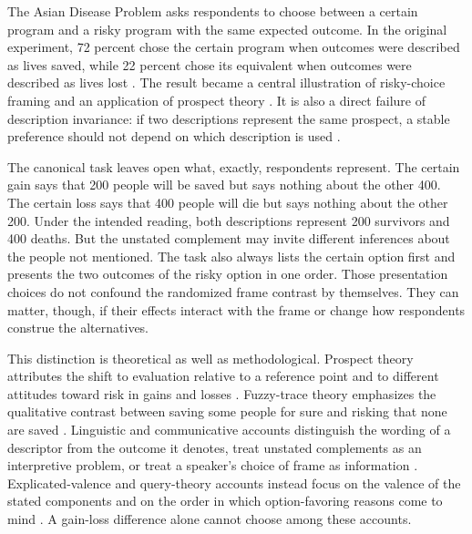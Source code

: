 \documentclass[11pt]{article}
\begin{document}
The Asian Disease Problem asks respondents to choose between a certain program and a risky program with the same expected outcome. In the original experiment, 72 percent chose the certain program when outcomes were described as lives saved, while 22 percent chose its equivalent when outcomes were described as lives lost \parencite{tversky1981framing}. The result became a central illustration of risky-choice framing and an application of prospect theory \parencite{kahneman1979prospect,levin1998typology}. It is also a direct failure of description invariance: if two descriptions represent the same prospect, a stable preference should not depend on which description is used \parencite{kahneman1984choices}.

The canonical task leaves open what, exactly, respondents represent. The certain gain says that 200 people will be saved but says nothing about the other 400. The certain loss says that 400 people will die but says nothing about the other 200. Under the intended reading, both descriptions represent 200 survivors and 400 deaths. But the unstated complement may invite different inferences about the people not mentioned. The task also always lists the certain option first and presents the two outcomes of the risky option in one order. Those presentation choices do not confound the randomized frame contrast by themselves. They can matter, though, if their effects interact with the frame or change how respondents construe the alternatives.

This distinction is theoretical as well as methodological. Prospect theory attributes the shift to evaluation relative to a reference point and to different attitudes toward risk in gains and losses \parencite{kahneman1979prospect,tversky1992advances}. Fuzzy-trace theory emphasizes the qualitative contrast between saving some people for sure and risking that none are saved \parencite{reyna1991fuzzy,kuhberger2010task}. Linguistic and communicative accounts distinguish the wording of a descriptor from the outcome it denotes, treat unstated complements as an interpretive problem, or treat a speaker's choice of frame as information \parencite{mandel2001gainloss,mckenzie2003speaker,sher2006information}. Explicated-valence and query-theory accounts instead focus on the valence of the stated components and on the order in which option-favoring reasons come to mind \parencite{tombu2015valence,wall2020query,composto2025query}. A gain-loss difference alone cannot choose among these accounts.
\end{document}
